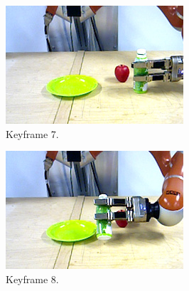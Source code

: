 \begin{figure}\ContinuedFloat
  \centering
  \begin{subfigure}[t]{0.475\textwidth}
    \includegraphics[width=\textwidth]{./figures/sec/planning/exec3/frame2366.jpg}
    \caption{Keyframe 7.}
    \label{fig:sec_usingaffordanceforplanning_results_scenario3_7}
  \end{subfigure}
  \hfill
  \begin{subfigure}[t]{0.475\textwidth}
    \includegraphics[width=\textwidth]{./figures/sec/planning/exec3/frame2561.jpg}
    \caption{Keyframe 8.}
    \label{fig:sec_usingaffordanceforplanning_results_scenario3_8}
  \end{subfigure}\\%
  \begin{subfigure}[t]{0.475\textwidth}

\end{subfigure}
\end{figure}
